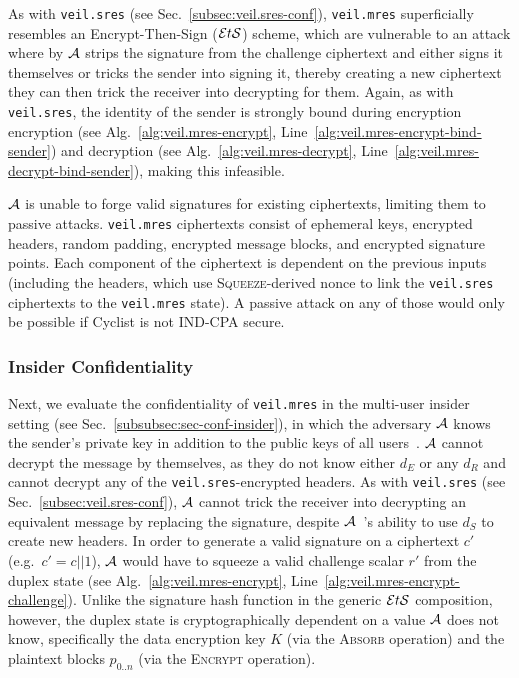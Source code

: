 As with \texttt{veil.sres} \@(see Sec.~\ref{subsec:veil.sres-conf})\@, \texttt{veil.mres}
superficially resembles an Encrypt-Then-Sign ($\mathcal{E}t\mathcal{S}$) scheme, which are vulnerable to an attack
where by $\mathcal{A}$ strips the signature from the challenge ciphertext and either signs it
themselves or tricks the sender into signing it, thereby creating a new ciphertext they can then
trick the receiver into decrypting for them.
Again, as with \texttt{veil.sres}\@, the identity of the sender is strongly bound during encryption
encryption (see Alg.~\ref{alg:veil.mres-encrypt}, Line~\ref{alg:veil.mres-encrypt-bind-sender}) and
decryption (see Alg.~\ref{alg:veil.mres-decrypt}, Line~\ref{alg:veil.mres-decrypt-bind-sender}),
making this infeasible.

$\mathcal{A}$ is unable to forge valid signatures for existing ciphertexts, limiting them to passive
attacks. \texttt{veil.mres} ciphertexts consist of ephemeral keys, encrypted headers, random
padding, encrypted message blocks, and encrypted signature points.
Each component of the ciphertext is dependent on the previous inputs (including the headers, which
use \textsc{Squeeze}\@-derived nonce to link the \texttt{veil.sres} ciphertexts to the
\texttt{veil.mres} state). A passive attack on any of those would only be possible if Cyclist is not
IND-CPA secure.

\subsubsection{Insider Confidentiality}

Next, we evaluate the confidentiality of \texttt{veil.mres} in the multi-user insider setting (see
Sec.~\ref{subsubsec:sec-conf-insider}), in which the adversary $\mathcal{A}$ knows the sender's
private key in addition to the public keys of all users~\cite[p. 45--46]{baek2010}\@.
$\mathcal{A}$ cannot decrypt the message by themselves, as they do not know either $d_E$ or any $d_R$
and cannot decrypt any of the \texttt{veil.sres}\@-encrypted headers.
As with \texttt{veil.sres} (see Sec.~\ref{subsec:veil.sres-conf})\@, $\mathcal{A}$ cannot trick the
receiver into decrypting an equivalent message by replacing the signature, despite $\mathcal{A}$~'s
ability to use $d_S$ to create new headers.
In order to generate a valid signature on a ciphertext $c'$ (e.g.\ $c'=c||1$), $\mathcal{A}$ would
have to squeeze a valid challenge scalar $r'$ from the duplex state (see
Alg.~\ref{alg:veil.mres-encrypt}, Line~\ref{alg:veil.mres-encrypt-challenge}).
Unlike the signature hash function in the generic $\mathcal{E}t\mathcal{S}$ composition, however, the duplex state is
cryptographically dependent on a value $\mathcal{A}$ does not know, specifically the data encryption
key $K$ \@(via the \textsc{Absorb} operation) and the plaintext blocks $p_{0..n}$ (via the
\textsc{Encrypt} operation).

